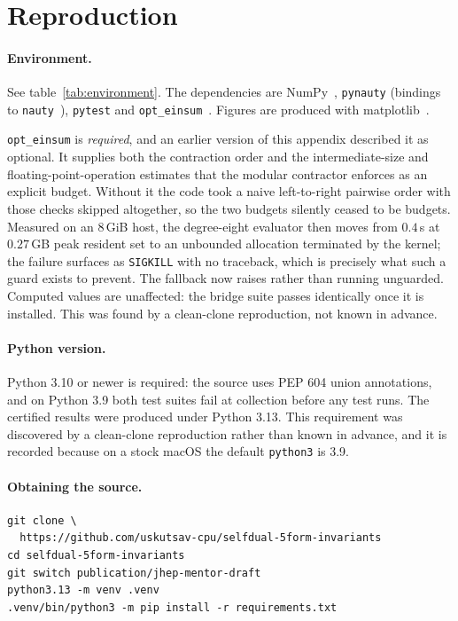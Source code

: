 \section{Reproduction}
\label{app:reproduction}

\paragraph{Environment.}
See table~\ref{tab:environment}. The dependencies are NumPy~\cite{Harris:2020},
\texttt{pynauty} (bindings to \texttt{nauty}~\cite{McKay:2013}),
\texttt{pytest} and \texttt{opt\_einsum}~\cite{Smith:2018}. Figures are
produced with matplotlib~\cite{Hunter:2007}.

\texttt{opt\_einsum} is \emph{required}, and an earlier version of this appendix
described it as optional. It supplies both the contraction order and the
intermediate-size and floating-point-operation estimates that the modular
contractor enforces as an explicit budget. Without it the code took a naive
left-to-right pairwise order with those checks skipped altogether, so the two
budgets silently ceased to be budgets. Measured on an 8\,GiB host, the
degree-eight evaluator then moves from $0.4$\,s at $0.27$\,GB peak resident set
to an unbounded allocation terminated by the kernel; the failure surfaces as
\texttt{SIGKILL} with no traceback, which is precisely what such a guard exists
to prevent. The fallback now raises rather than running unguarded. Computed
values are unaffected: the bridge suite passes identically once it is installed.
This was found by a clean-clone reproduction, not known in advance.

\paragraph{Python version.}
Python 3.10 or newer is required: the source uses PEP 604 union annotations, and
on Python 3.9 both test suites fail at collection before any test runs. The
certified results were produced under Python 3.13. This requirement was
discovered by a clean-clone reproduction rather than known in advance, and it is
recorded because on a stock macOS the default \texttt{python3} is 3.9.

\paragraph{Obtaining the source.}
\begin{verbatim}
git clone \
  https://github.com/uskutsav-cpu/selfdual-5form-invariants
cd selfdual-5form-invariants
git switch publication/jhep-mentor-draft
python3.13 -m venv .venv
.venv/bin/python3 -m pip install -r requirements.txt
\end{verbatim}


